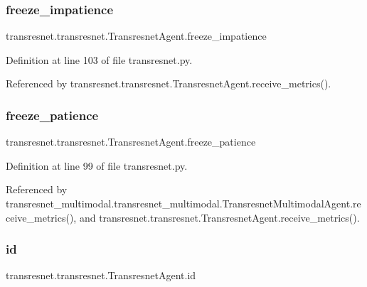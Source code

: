 \subsubsection{\texorpdfstring{freeze\+\_\+impatience}{freeze\_impatience}}
{\footnotesize\ttfamily transresnet.\+transresnet.\+Transresnet\+Agent.\+freeze\+\_\+impatience}



Definition at line 103 of file transresnet.\+py.



Referenced by transresnet.\+transresnet.\+Transresnet\+Agent.\+receive\+\_\+metrics().

\mbox{\label{classtransresnet_1_1transresnet_1_1TransresnetAgent_a3790cb456738e39c9690918c41cc4997}} 
\subsubsection{\texorpdfstring{freeze\+\_\+patience}{freeze\_patience}}
{\footnotesize\ttfamily transresnet.\+transresnet.\+Transresnet\+Agent.\+freeze\+\_\+patience}



Definition at line 99 of file transresnet.\+py.



Referenced by transresnet\+\_\+multimodal.\+transresnet\+\_\+multimodal.\+Transresnet\+Multimodal\+Agent.\+receive\+\_\+metrics(), and transresnet.\+transresnet.\+Transresnet\+Agent.\+receive\+\_\+metrics().

\mbox{\label{classtransresnet_1_1transresnet_1_1TransresnetAgent_a5cf815f184a1cfe8eaae18581c3df35e}} 
\subsubsection{\texorpdfstring{id}{id}}
{\footnotesize\ttfamily transresnet.\+transresnet.\+Transresnet\+Agent.\+id}



